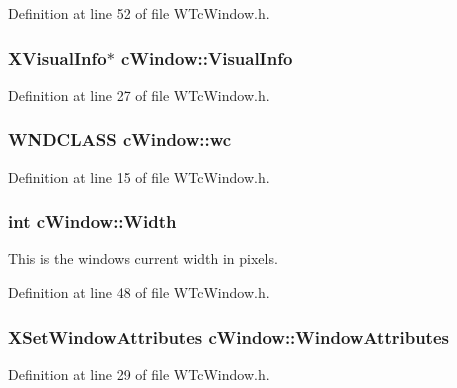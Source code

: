 Definition at line 52 of file WTcWindow.h.

\hypertarget{classc_window_a3baae479c64be51ef0c3ca85064d8a02}{
\subsubsection[{VisualInfo}]{\setlength{\rightskip}{0pt plus 5cm}XVisualInfo$\ast$ {\bf cWindow::VisualInfo}}}
\label{classc_window_a3baae479c64be51ef0c3ca85064d8a02}


Definition at line 27 of file WTcWindow.h.

\hypertarget{classc_window_a43d5d7dc391f22c2710cbdc6a7cf0636}{
\subsubsection[{wc}]{\setlength{\rightskip}{0pt plus 5cm}WNDCLASS {\bf cWindow::wc}}}
\label{classc_window_a43d5d7dc391f22c2710cbdc6a7cf0636}


Definition at line 15 of file WTcWindow.h.

\hypertarget{classc_window_af50a65d8b98d34123714c555fbe02cba}{
\subsubsection[{Width}]{\setlength{\rightskip}{0pt plus 5cm}int {\bf cWindow::Width}}}
\label{classc_window_af50a65d8b98d34123714c555fbe02cba}


This is the windows current width in pixels. 



Definition at line 48 of file WTcWindow.h.

\hypertarget{classc_window_a0c4adb22e5c6fb4d76dde8675f54d92e}{
\subsubsection[{WindowAttributes}]{\setlength{\rightskip}{0pt plus 5cm}XSetWindowAttributes {\bf cWindow::WindowAttributes}}}
\label{classc_window_a0c4adb22e5c6fb4d76dde8675f54d92e}


Definition at line 29 of file WTcWindow.h.

